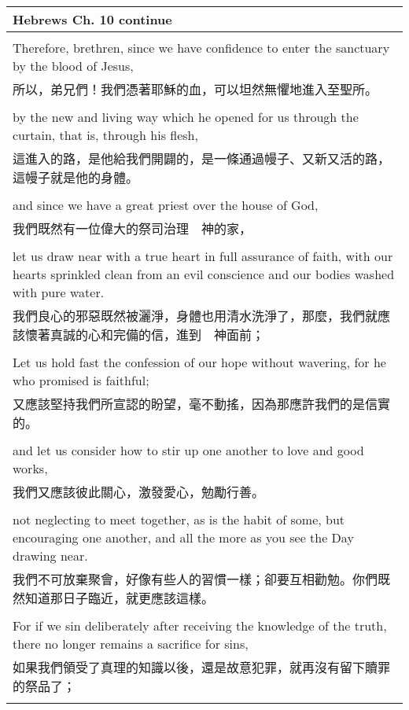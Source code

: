 \documentclass{book}
\begin{document}
\newpage

\begin{tabularx}{\textwidth}{p{}}
\hline
Hebrews Ch. 10 continue \\
\hline \\
Therefore, brethren, since we have confidence to enter the sanctuary by the blood of Jesus, \\
所以，弟兄們！我們憑著耶穌的血，可以坦然無懼地進入至聖所。 \\ \\
by the new and living way which he opened for us through the curtain, that is, through his flesh, \\
這進入的路，是他給我們開闢的，是一條通過幔子、又新又活的路，這幔子就是他的身體。 \\ \\
and since we have a great priest over the house of God, \\
我們既然有一位偉大的祭司治理　神的家， \\ \\
let us draw near with a true heart in full assurance of faith, with our hearts sprinkled clean from an evil conscience and our bodies washed with pure water. \\
我們良心的邪惡既然被灑淨，身體也用清水洗淨了，那麼，我們就應該懷著真誠的心和完備的信，進到　神面前； \\ \\
Let us hold fast the confession of our hope without wavering, for he who promised is faithful; \\
又應該堅持我們所宣認的盼望，毫不動搖，因為那應許我們的是信實的。 \\ \\
and let us consider how to stir up one another to love and good works, \\
我們又應該彼此關心，激發愛心，勉勵行善。 \\ \\
not neglecting to meet together, as is the habit of some, but encouraging one another, and all the more as you see the Day drawing near. \\
我們不可放棄聚會，好像有些人的習慣一樣；卻要互相勸勉。你們既然知道那日子臨近，就更應該這樣。 \\ \\
For if we sin deliberately after receiving the knowledge of the truth, there no longer remains a sacrifice for sins, \\
如果我們領受了真理的知識以後，還是故意犯罪，就再沒有留下贖罪的祭品了； \\ \\

\end{tabularx}
\end{document}
